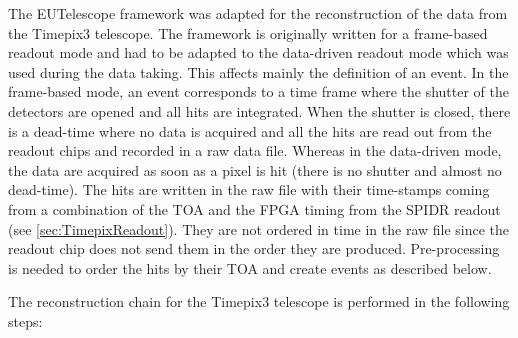 The EUTelescope framework was adapted for the reconstruction of the
data from the Timepix3 telescope. The framework is originally written
for a frame-based readout mode and had to be adapted to the
data-driven readout mode which was used during the data taking. This
affects mainly the definition of an event. In the frame-based mode, an
event corresponds to a time frame where the shutter of the detectors
are opened and all hits are integrated. When the shutter is closed,
there is a dead-time where no data is acquired and all the hits are
read out from the readout chips and recorded in a raw data
file. Whereas in the data-driven mode, the data are acquired as soon
as a pixel is hit (there is no shutter and almost no dead-time). The
hits are written in the raw file with their time-stamps coming from a
combination of the TOA and the FPGA timing from the SPIDR readout (see
\cref{sec:TimepixReadout}). They are not ordered in time in the raw
file since the readout chip does not send them in the order they are
produced. Pre-processing is needed to order the hits by their TOA and
create events as described below.

The reconstruction chain for the Timepix3 telescope is performed in
the following steps:

